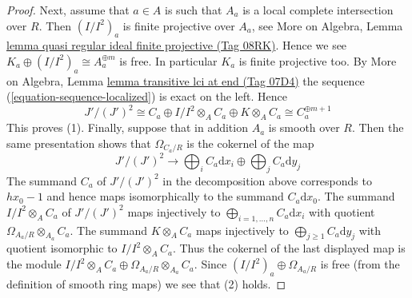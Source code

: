 \documentclass{amsart}
\theoremstyle{plain}
\theoremstyle{definition}
\theoremstyle{remark}
\numberwithin{equation}{subsection}
\begin{document}
\begin{proof}
\medskip\noindent
Next, assume that $a \in A$ is such that $A_a$ is a local complete
intersection over $R$. Then $(I/I^2)_a$ is finite projective over $A_a$, see
More on Algebra, Lemma
\href{https://stacks.math.columbia.edu/tag/08RK}{lemma quasi regular ideal finite projective (Tag 08RK)}.
Hence we see $K_a \oplus (I/I^2)_a \cong A_a^{\oplus m}$ is free.
In particular $K_a$ is finite projective too.
By More on Algebra, Lemma \href{https://stacks.math.columbia.edu/tag/07D4}{lemma transitive lci at end (Tag 07D4)}
the sequence (\ref{equation-sequence-localized}) is exact on the left.
Hence
$$
J'/(J')^2 \cong
C_a \oplus I/I^2 \otimes_A C_a \oplus K \otimes_A C_a \cong
C_a^{\oplus m + 1}
$$
This proves (1). Finally, suppose that in addition $A_a$ is smooth over
$R$. Then the same presentation shows that $\Omega_{C_a/R}$
is the cokernel of the map
$$
J'/(J')^2 \longrightarrow
\bigoplus\nolimits_i C_a\text{d}x_i \oplus \bigoplus\nolimits_j C_a\text{d}y_j
$$
The summand $C_a$ of $J'/(J')^2$ in the decomposition above
corresponds to $hx_0 - 1$ and hence maps
isomorphically to the summand $C_a\text{d}x_0$. The summand
$I/I^2 \otimes_A C_a$ of $J'/(J')^2$ maps injectively to
$\bigoplus_{i = 1, \ldots, n} C_a\text{d}x_i$
with quotient $\Omega_{A_a/R} \otimes_{A_a} C_a$. The summand
$K \otimes_A C_a$ maps injectively to
$\bigoplus_{j \geq 1} C_a\text{d}y_j$ with quotient isomorphic to
$I/I^2 \otimes_A C_a$. Thus the cokernel of the last displayed
map is the module
$I/I^2 \otimes_A C_a \oplus \Omega_{A_a/R} \otimes_{A_a} C_a$.
Since $(I/I^2)_a \oplus \Omega_{A_a/R}$ is
free (from the definition of smooth ring maps) we see that (2) holds.
\end{proof}
\end{document}
